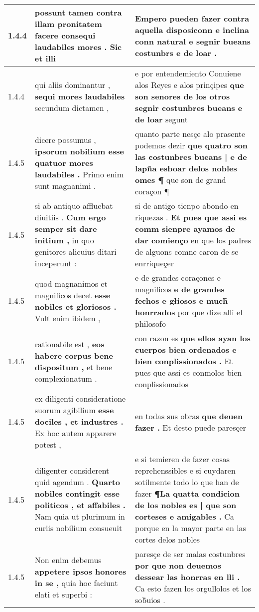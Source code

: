 \begin{tabular}{|p{1cm}|p{6.5cm}|p{6.5cm}|}
1.4.4 & possunt tamen contra illam pronitatem facere \textbf{ consequi laudabiles mores . } Sic et illi & Empero pueden fazer contra aquella disposiconn \textbf{ e inclina conn natural } e segnir bueans costunbrs e de loar . \\\hline
1.4.4 & qui aliis dominantur , \textbf{ sequi mores laudabiles } secundum dictamen , & e por entendemiento Conuiene alos Reyes e alos prinçipes \textbf{ que son senores de los otros segnir costunbres bueans e de loar } segunt \\\hline
1.4.5 & dicere possumus , \textbf{ ipsorum nobilium esse quatuor mores laudabiles . } Primo enim sunt magnanimi . & quanto parte nesçe alo prasente podemos dezir \textbf{ que quatro son las costunbres bueans | e de lapña esboar delos nobles omes ¶ } que son de grand coraçon ¶ \\\hline
1.4.5 & si ab antiquo affluebat diuitiis . \textbf{ Cum ergo semper sit dare initium , } in quo genitores alicuius ditari inceperunt : & si de antigo tienpo abondo en riquezas . \textbf{ Et pues que assi es comm sienpre ayamos de dar comienço } en que los padres de alguons comne caron de se enrriqueçer \\\hline
1.4.5 & quod magnanimos et magnificos decet \textbf{ esse nobiles et gloriosos . } Vult enim ibidem , & e de grandes coraçones e magnificos \textbf{ e de grandes fechos e głiosos e much̃ honrrados } por que dize alli el philosofo \\\hline
1.4.5 & rationabile est , \textbf{ eos habere corpus bene dispositum , } et bene complexionatum . & con razon es \textbf{ que ellos ayan los cuerpos bien ordenados e bien conplissionados . } Et pues que assi es conmolos bien conplissionados \\\hline
1.4.5 & ex diligenti consideratione suorum agibilium \textbf{ esse dociles , et industres . } Ex hoc autem apparere potest , & en todas sus obras \textbf{ que deuen fazer . } Et desto puede paresçer \\\hline
1.4.5 & diligenter considerent quid agendum . \textbf{ Quarto nobiles contingit esse politicos , et affabiles . } Nam quia ut plurimum in curiis nobilium consueuit & e si temieren de fazer cosas reprehenssibles e si cuydaren sotilmente todo lo que han de fazer \textbf{ ¶La quatta condicion de los nobles es | que son corteses e amigables . } Ca porque en la mayor parte en las cortes delos nobles \\\hline
1.4.5 & Non enim debemus \textbf{ appetere ipsos honores in se , } quia hoc faciunt elati et superbi : & paresçe de ser malas costunbres \textbf{ por que non deuemos dessear las honrras en lli . } Ca esto fazen los orgullolos et los sob̃uios . \\\hline

\end{tabular}

